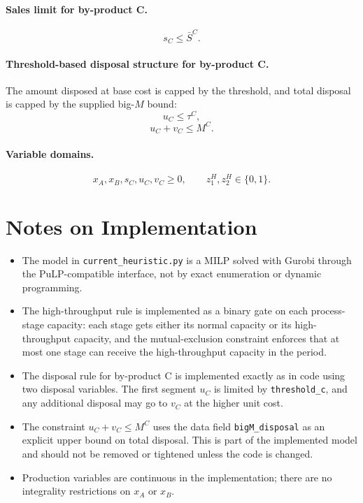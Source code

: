 \paragraph{Sales limit for by-product C.}
\[
s_C \le \bar S^{C}.
\]

\paragraph{Threshold-based disposal structure for by-product C.}
The amount disposed at base cost is capped by the threshold, and total disposal is capped by the supplied big-$M$ bound:
\[
u_C \le \tau^{C},
\]
\[
u_C + v_C \le M^{C}.
\]

\paragraph{Variable domains.}
\[
x_A, x_B, s_C, u_C, v_C \ge 0,
\qquad
z^{H}_{1}, z^{H}_{2} \in \{0,1\}.
\]

\section*{Notes on Implementation}

\begin{itemize}
    \item The model in \texttt{current\_heuristic.py} is a MILP solved with Gurobi through the PuLP-compatible interface, not by exact enumeration or dynamic programming.
    \item The high-throughput rule is implemented as a binary gate on each process-stage capacity: each stage gets either its normal capacity or its high-throughput capacity, and the mutual-exclusion constraint enforces that at most one stage can receive the high-throughput capacity in the period.
    \item The disposal rule for by-product C is implemented exactly as in code using two disposal variables. The first segment $u_C$ is limited by \texttt{threshold\_c}, and any additional disposal may go to $v_C$ at the higher unit cost.
    \item The constraint $u_C + v_C \le M^{C}$ uses the data field \texttt{bigM\_disposal} as an explicit upper bound on total disposal. This is part of the implemented model and should not be removed or tightened unless the code is changed.
    \item Production variables are continuous in the implementation; there are no integrality restrictions on $x_A$ or $x_B$.
\end{itemize}

